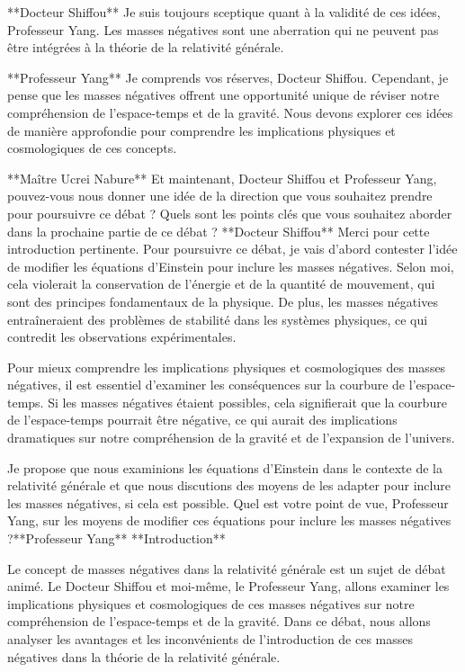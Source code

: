 **Docteur Shiffou**
Je suis toujours sceptique quant à la validité de ces idées, Professeur Yang. Les masses négatives sont une aberration qui ne peuvent pas être intégrées à la théorie de la relativité générale.

**Professeur Yang**
Je comprends vos réserves, Docteur Shiffou. Cependant, je pense que les masses négatives offrent une opportunité unique de réviser notre compréhension de l'espace-temps et de la gravité. Nous devons explorer ces idées de manière approfondie pour comprendre les implications physiques et cosmologiques de ces concepts.

**Maître Ucrei Nabure**
Et maintenant, Docteur Shiffou et Professeur Yang, pouvez-vous nous donner une idée de la direction que vous souhaitez prendre pour poursuivre ce débat ? Quels sont les points clés que vous souhaitez aborder dans la prochaine partie de ce débat ?
**Docteur Shiffou**
Merci pour cette introduction pertinente. Pour poursuivre ce débat, je vais d'abord contester l'idée de modifier les équations d'Einstein pour inclure les masses négatives. Selon moi, cela violerait la conservation de l'énergie et de la quantité de mouvement, qui sont des principes fondamentaux de la physique. De plus, les masses négatives entraîneraient des problèmes de stabilité dans les systèmes physiques, ce qui contredit les observations expérimentales.

Pour mieux comprendre les implications physiques et cosmologiques des masses négatives, il est essentiel d'examiner les conséquences sur la courbure de l'espace-temps. Si les masses négatives étaient possibles, cela signifierait que la courbure de l'espace-temps pourrait être négative, ce qui aurait des implications dramatiques sur notre compréhension de la gravité et de l'expansion de l'univers.

Je propose que nous examinions les équations d'Einstein dans le contexte de la relativité générale et que nous discutions des moyens de les adapter pour inclure les masses négatives, si cela est possible. Quel est votre point de vue, Professeur Yang, sur les moyens de modifier ces équations pour inclure les masses négatives ?**Professeur Yang**
**Introduction**

Le concept de masses négatives dans la relativité générale est un sujet de débat animé. Le Docteur Shiffou et moi-même, le Professeur Yang, allons examiner les implications physiques et cosmologiques de ces masses négatives sur notre compréhension de l'espace-temps et de la gravité. Dans ce débat, nous allons analyser les avantages et les inconvénients de l'introduction de ces masses négatives dans la théorie de la relativité générale.

